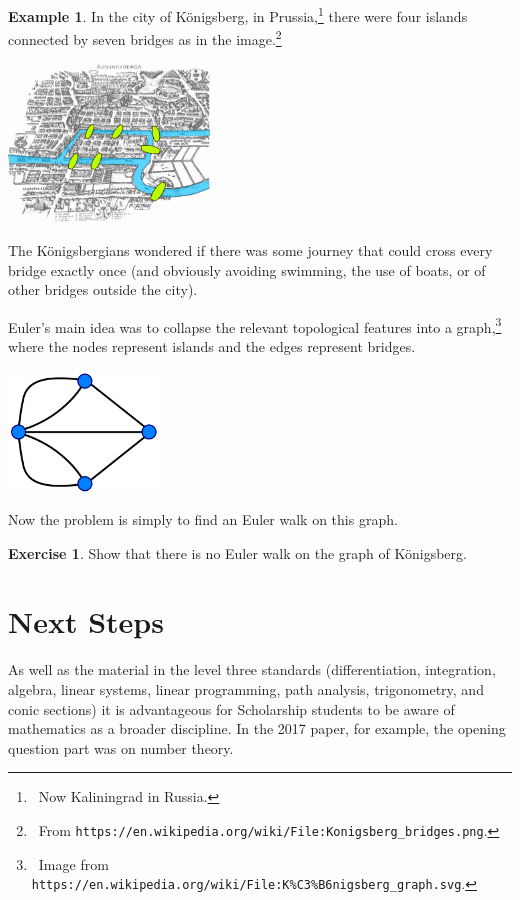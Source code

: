 \documentclass[a4paper]{amsart}
\theoremstyle{definition}
\newtheorem{ex}[thm]{Example}
\newtheorem{exercise}[thm]{Exercise}
\theoremstyle{remark}
\begin{document}
\begin{ex}
  In the city of K\"onigsberg, in Prussia,\footnote{~Now Kaliningrad in Russia.} there were four islands connected by seven bridges as
  in the image.\footnote{~From \texttt{https://en.wikipedia.org/wiki/File:Konigsberg\_bridges.png}.}
  \begin{center}
    \includegraphics[width=0.4\textwidth]{konig1}
  \end{center}
  The K\"onigsbergians wondered if there was some journey that could cross every bridge exactly once (and obviously avoiding swimming, the use of boats, or of
  other bridges outside the city).

  Euler's main idea was to collapse the relevant topological features into a graph,\footnote{~Image from \texttt{https://en.wikipedia.org/wiki/File:K\%C3\%B6nigsberg\_graph.svg}.} where the nodes represent islands and the edges represent bridges.
  \begin{center}
    \includegraphics[width=0.3\textwidth]{konig2}
  \end{center}
  Now the problem is simply to find an Euler walk on this graph.
\end{ex}

\begin{exercise}
  Show that there is no Euler walk on the graph of K\"onigsberg.
\end{exercise}

\section{Next Steps}
As well as the material in the level three standards (differentiation, integration, algebra, linear systems, linear programming, path analysis,
trigonometry, and conic sections) it is advantageous for Scholarship students to be aware of mathematics as a broader discipline. In the 2017
paper, for example, the opening question part was on number theory.
\end{document}
